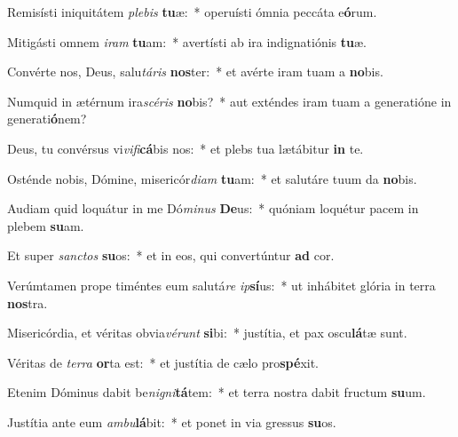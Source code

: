 \item Remisísti iniquitátem \textit{ple}\textit{bis} \textbf{tu}æ:~* operuísti ómnia peccáta e\textbf{ó}rum.
\item Mitigásti omnem \textit{i}\textit{ram} \textbf{tu}am:~* avertísti ab ira indignatiónis \textbf{tu}æ.
\item Convérte nos, Deus, salu\textit{tá}\textit{ris} \textbf{nos}ter:~* et avérte iram tuam a \textbf{no}bis.
\item Numquid in ætérnum ira\textit{scé}\textit{ris} \textbf{no}bis?~* aut exténdes iram tuam a generatióne in generati\textbf{ó}nem?
\item Deus, tu convérsus vi\textit{vi}\textit{fi}\textbf{cá}bis nos:~* et plebs tua lætábitur \textbf{in} te.
\item Osténde nobis, Dómine, misericór\textit{di}\textit{am} \textbf{tu}am:~* et salutáre tuum da \textbf{no}bis.
\item Audiam quid loquátur in me Dó\textit{mi}\textit{nus} \textbf{De}us:~* quóniam loquétur pacem in plebem \textbf{su}am.
\item Et super \textit{sanc}\textit{tos} \textbf{su}os:~* et in eos, qui convertúntur \textbf{ad} cor.
\item Verúmtamen prope timéntes eum salutá\textit{re} \textit{ip}\textbf{sí}us:~* ut inhábitet glória in terra \textbf{nos}tra.
\item Misericórdia, et véritas obvia\textit{vé}\textit{runt} \textbf{si}bi:~* justítia, et pax oscu\textbf{lá}tæ sunt.
\item Véritas de \textit{ter}\textit{ra} \textbf{or}ta est:~* et justítia de cælo pro\textbf{spé}xit.
\item Etenim Dóminus dabit be\textit{ni}\textit{gni}\textbf{tá}tem:~* et terra nostra dabit fructum \textbf{su}um.
\item Justítia ante eum \textit{am}\textit{bu}\textbf{lá}bit:~* et ponet in via gressus \textbf{su}os.
